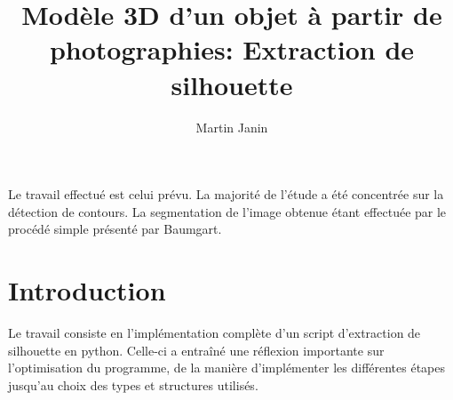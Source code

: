 \documentclass{article}
\author{Martin Janin}
\title{Modèle 3D d'un objet à partir de photographies: Extraction de silhouette}
\begin{document}
\maketitle

Le travail effectué est celui prévu. La majorité de l'étude a été concentrée sur la détection de contours. La segmentation de l'image obtenue étant effectuée par le procédé simple présenté par Baumgart.

\noindent\makebox[\linewidth]{\rule{\textwidth}{0.4pt}}
\vspace{-0.8cm}
\tableofcontents
\noindent\makebox[\linewidth]{\rule{\textwidth}{0.4pt}}

\bigskip
\bigskip

\section{Introduction}

Le travail consiste en l'implémentation complète d'un script d'extraction de silhouette en python. Celle-ci a entraîné une réflexion importante sur l'optimisation du programme, de la manière d'implémenter les différentes étapes jusqu'au choix des types et structures utilisés.

\pagebreak
\end{document}
